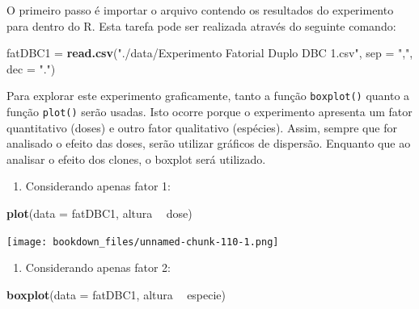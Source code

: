 \documentclass[
]{article}
\newenvironment{Shaded}{\begin{snugshade}}{\end{snugshade}}
\newcommand{\DataTypeTok}[1]{\textcolor[rgb]{0.13,0.29,0.53}{#1}}
\newcommand{\KeywordTok}[1]{\textcolor[rgb]{0.13,0.29,0.53}{\textbf{#1}}}
\newcommand{\NormalTok}[1]{#1}
\newcommand{\OperatorTok}[1]{\textcolor[rgb]{0.81,0.36,0.00}{\textbf{#1}}}
\newcommand{\StringTok}[1]{\textcolor[rgb]{0.31,0.60,0.02}{#1}}
\providecommand{\tightlist}{%
  \setlength{\itemsep}{0pt}\setlength{\parskip}{0pt}}
\begin{document}
O primeiro passo é importar o arquivo contendo os resultados do experimento para dentro do R. Esta tarefa pode ser realizada através do seguinte comando:

\begin{Shaded}
\begin{Highlighting}[]
\NormalTok{fatDBC1 =}\StringTok{ }\KeywordTok{read.csv}\NormalTok{(}\StringTok{"./data/Experimento Fatorial Duplo DBC 1.csv"}\NormalTok{, }
                   \DataTypeTok{sep =} \StringTok{","}\NormalTok{, }\DataTypeTok{dec =} \StringTok{"."}\NormalTok{)}
\end{Highlighting}
\end{Shaded}

Para explorar este experimento graficamente, tanto a função \texttt{boxplot()} quanto a função \texttt{plot()} serão usadas. Isto ocorre porque o experimento apresenta um fator quantitativo (doses) e outro fator qualitativo (espécies). Assim, sempre que for analisado o efeito das doses, serão utilizar gráficos de dispersão. Enquanto que ao analisar o efeito dos clones, o boxplot será utilizado.

\begin{enumerate}
\def\labelenumi{\arabic{enumi}.}
\tightlist
\item
  Considerando apenas fator 1:
\end{enumerate}

\begin{Shaded}
\begin{Highlighting}[]
\KeywordTok{plot}\NormalTok{(}\DataTypeTok{data =}\NormalTok{ fatDBC1, altura }\OperatorTok{~}\StringTok{ }\NormalTok{dose)}
\end{Highlighting}
\end{Shaded}

\texttt{[image: bookdown\_files/unnamed-chunk-110-1.png]}

\begin{enumerate}
\def\labelenumi{\arabic{enumi}.}
\setcounter{enumi}{1}
\tightlist
\item
  Considerando apenas fator 2:
\end{enumerate}

\begin{Shaded}
\begin{Highlighting}[]
\KeywordTok{boxplot}\NormalTok{(}\DataTypeTok{data =}\NormalTok{ fatDBC1, altura }\OperatorTok{~}\StringTok{ }\NormalTok{especie)}
\end{Highlighting}
\end{Shaded}
\end{document}
